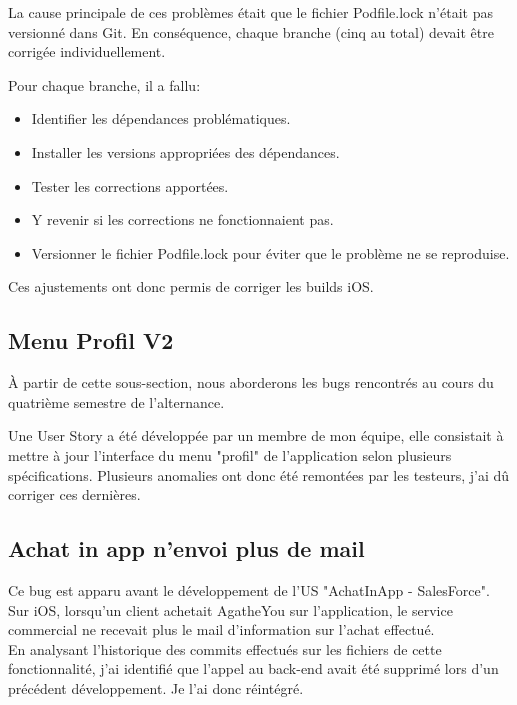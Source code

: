 \documentclass{article}
\begin{document}
La cause principale de ces problèmes était que le fichier Podfile.lock n'était pas versionné dans Git. En conséquence, chaque branche (cinq au total) devait être corrigée individuellement. 

Pour chaque branche, il a fallu:

\begin{itemize}
    \item Identifier les dépendances problématiques.
    \item Installer les versions appropriées des dépendances.
    \item Tester les corrections apportées.
    \item Y revenir si les corrections ne fonctionnaient pas.
    \item Versionner le fichier Podfile.lock pour éviter que le problème ne se reproduise.
\end{itemize}

Ces ajustements ont donc permis de corriger les builds iOS.

\subsection{Menu Profil V2}

À partir de cette sous-section, nous aborderons les bugs rencontrés au cours du quatrième semestre de l'alternance.

Une User Story a été développée par un membre de mon équipe, elle consistait à mettre à jour l'interface du menu "profil" de l'application selon plusieurs spécifications.
Plusieurs anomalies ont donc été remontées par les testeurs, j'ai dû corriger ces dernières.

\subsection{ Achat in app n'envoi plus de mail}

Ce bug est apparu avant le développement de l'US "AchatInApp - SalesForce". \\
Sur iOS, lorsqu'un client achetait AgatheYou sur l'application, le service commercial ne recevait plus le mail d'information sur l'achat effectué. \\

En analysant l'historique des commits effectués sur les fichiers de cette fonctionnalité, j'ai identifié que l'appel au back-end avait été supprimé lors d'un précédent développement. Je l'ai donc réintégré.
\end{document}
